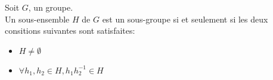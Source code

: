\documentclass[../main.tex]{subfile}
\begin{document}
\begin{ex}
\begin{prop}
	Soit $G$, un groupe.\\
	Un sous-ensemble $H$ de $G$ est un sous-groupe si et seulement si les deux consitions suivantes sont satisfaites:
\begin{itemize}	
	\item $H \neq \emptyset$
	\item $\forall h_1, h_2 \in H, h_1h_2^{-1} \in H$
\end{itemize}
\end{prop}















































\end{ex}
\end{document}
